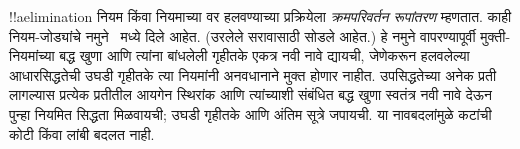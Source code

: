 \documentclass[../../../include/open-logic-section]{subfiles}
\begin{document}
!!a{elimination} नियम
\Elim{\lor} किंवा
\Elim{\lexists} नियमाच्या
वर हलवण्याच्या प्रक्रियेला
\emph{क्रमपरिवर्तन रूपांतरण}
म्हणतात. काही नियम-जोड्यांचे
नमुने~
मध्ये दिले आहेत.
(उरलेले सरावासाठी सोडले आहेत.)
हे नमुने वापरण्यापूर्वी मुक्ती-नियमांच्या बद्ध खुणा आणि
त्यांना बांधलेली गृहीतके एकत्र नवी नावे द्यायची,
जेणेकरून हलवलेल्या आधारसिद्धतेची उघडी गृहीतके
त्या नियमांनी अनवधानाने मुक्त होणार नाहीत.
उपसिद्धतेच्या अनेक प्रती लागल्यास प्रत्येक प्रतीतील
आयगेन स्थिरांक आणि त्यांच्याशी संबंधित बद्ध खुणा
स्वतंत्र नवी नावे देऊन पुन्हा नियमित सिद्धता मिळवायची;
उघडी गृहीतके आणि अंतिम सूत्रे जपायची.
या नावबदलांमुळे कटांची कोटी किंवा लांबी बदलत नाही.

\end{document}
